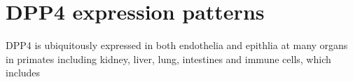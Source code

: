 \section{DPP4 expression patterns}
DPP4 is ubiquitously expressed in both endothelia and epithlia at many organs in primates including kidney, liver, lung, intestines and immune cells, which includes